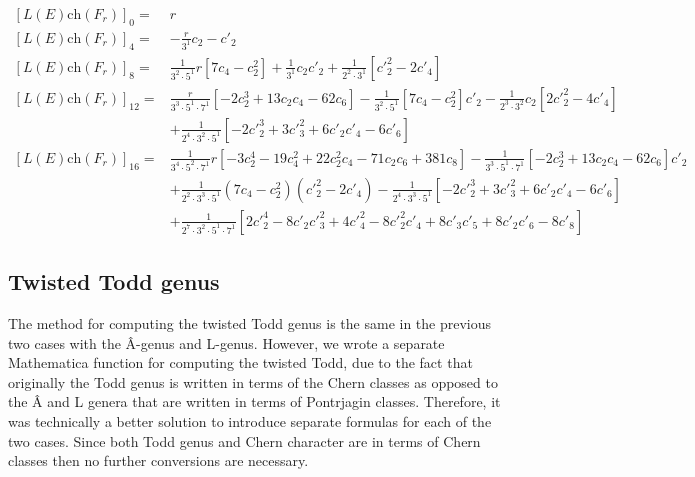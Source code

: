 \documentclass{amsart}
\theoremstyle{plain}
\newcommand{\ch}{\mathrm{ch}}
\numberwithin{equation}{section}
\begin{document}
\begin{tcolorbox}[text width=16cm, height=5.5cm,
title=L-genus twisted by $SU(r)$ bundle]
{\footnotesize
\begin{align*} 
{[L(E)\ch(F_r)]}_0= & r
\\
{[L(E)\ch(F_r)]}_4 =  & -\tfrac{r}{3^1} c_2 - c'_2
\\
{[L(E)\ch(F_r)]}_8 = &
\tfrac{1}{3^2\cdot 5^1} r [7 c_4-c_2^2]
+\tfrac{1}{3^1} c_2  c'_2+
\tfrac{1}{2^2\cdot 3^1}[ {c'}_2^2-2 c'_4]
\\
{[L(E)\ch(F_r)]}_{12} = &
\tfrac{r}{3^3\cdot 5^1\cdot 7^1}[-2 c_2^3+ 13 c_2 c_4-62 c_6]
-\tfrac{1}{3^2\cdot 5^1}[7 c_4-c_2^2] c'_2
-\tfrac{1}{2^3\cdot 3^2} c_2 [2 {c'}_2^2-4 c'_4]
\\
&
+\tfrac{1}{2^4\cdot 3^2\cdot 5^1}[-2 {c'}_2^3+
 3 {c'}_3^2+  6 c'_2  c'_4-  6 c'_6]
 \\
{[L(E)\ch(F_r)]}_{16} = &
\tfrac{1}{3^4\cdot 5^2\cdot 7^1} r 
[-3 c_2^4-19 c_4^2+ 22 c_2^2 
 c_4- 71 c_2  c_6+381 c_8]
-\tfrac{1}{3^3\cdot 5^1\cdot 7^1}[-2 c_2^3+ 13 c_2  c_4-62 c_6] c'_2
\\
&
+\tfrac{1}{2^2\cdot 3^3\cdot 5^1}\left(7 c_4-c_2^2\right) 
\left(  {c'}_2^2-2 c'_4\right) 
 -
\tfrac{1}{2^4\cdot 3^3\cdot 5^1}[-2 {c'}_2^3
+3 {c'}_3^2
+6 c'_2 c'_4
-6 c'_6]
\\
&
+
\tfrac{1}{2^7\cdot 3^2\cdot 5^1\cdot 7^1}[
2 {c'}_2^4
-8 c'_2{c'}_3^2
+4 {c'}_4^2
- 8 {c'}_2^2 c'_4
+8 c'_3c'_5
+8 c'_2c'_6
-8 c'_8]
\end{align*}
}
\end{tcolorbox}






\subsection{\bf Twisted Todd genus}

The method for computing the twisted Todd genus is the same in the previous two cases with the \^{A}-genus and L-genus. However, we wrote a separate Mathematica function for computing the twisted Todd, due to the fact that originally the Todd genus is written in terms of the Chern classes as opposed to the \^{A} and L genera that are written in terms of Pontrjagin classes. Therefore, it was technically a better solution to introduce separate formulas for each of the two cases. Since both Todd genus and Chern character are in terms of Chern classes then no further conversions are necessary.
\end{document}
